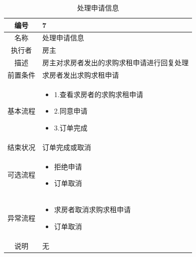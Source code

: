 \begin{table}[htbp]
	\centering
	\begin{tabular}{|c|p{11cm}|}
        \hline
        编号 & 7 \\
        \hline
        名称 & 处理申请信息 \\ 
        \hline
        执行者 & 房主 \\
        \hline
        描述 & 房主对求房者发出的求购求租申请进行回复处理\\
        \hline
        前置条件 & 求房者发出求购求租申请 \\
        \hline
        基本流程 & \begin{itemize}
            \item 1.查看求房者的求购求租申请
            \item 2.同意申请
            \item 3.订单完成
        \end{itemize} \\
        \hline
        结束状况 & 订单完成或取消 \\
        \hline
        可选流程 &  \begin{itemize}
            \item 拒绝申请
            \item 订单取消
        \end{itemize} \\
        \hline
        异常流程 & \begin{itemize}
            \item 求房者取消求购求租申请
            \item 订单取消
        \end{itemize} \\
        \hline
        说明 & 无 \\
        \hline
    \end{tabular}
    \caption{处理申请信息}
\end{table}

